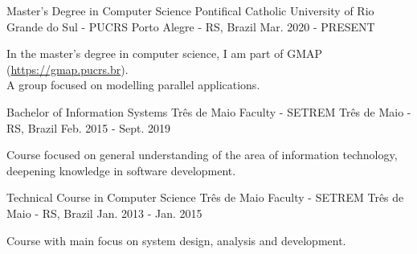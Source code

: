 
\begin{cventries}
  \cventry
  {Master's Degree in Computer Science} %
  {Pontifical Catholic University of Rio Grande do Sul - PUCRS} %
  {Porto Alegre - RS, Brazil} %
  {Mar. 2020 - PRESENT} %
  {
    \begin{cvitems} %
      \item {In the master's degree in computer science, I am part of GMAP (\href{https://gmap.pucrs.br}{https://gmap.pucrs.br}).\\A group focused on modelling parallel applications.}
    \end{cvitems}
  }

  \cventry
  {Bachelor of Information Systems} %
  {Três de Maio Faculty - SETREM} %
  {Três de Maio - RS, Brazil} %
  {Feb. 2015 - Sept. 2019} %
  {
    \begin{cvitems} %
      \item {Course focused on general understanding of the area of information technology,\\deepening knowledge in software development.}
    \end{cvitems}
  }

  \cventry
  {Technical Course in Computer Science} %
  {Três de Maio Faculty - SETREM} %
  {Três de Maio - RS, Brazil} %
  {Jan. 2013 - Jan. 2015} %
  {
    \begin{cvitems} %
      \item {Course with main focus on system design, analysis and development.}
    \end{cvitems}
  }
\end{cventries}
